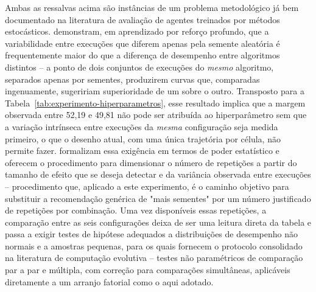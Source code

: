 \documentclass[12pt,a4paper]{article}
\begin{document}
Ambas as ressalvas acima são instâncias de um problema metodológico já bem documentado na
literatura de avaliação de agentes treinados por métodos estocásticos.
 demonstram, em aprendizado por reforço profundo, que a
variabilidade entre execuções que diferem apenas pela semente aleatória é frequentemente maior do
que a diferença de desempenho entre algoritmos distintos -- a ponto de dois conjuntos de execuções
do \textit{mesmo} algoritmo, separados apenas por sementes, produzirem curvas que, comparadas
ingenuamente, sugeririam superioridade de um sobre o outro. Transposto para a
Tabela~\ref{tab:experimento-hiperparametros}, esse resultado implica que a margem observada entre
52,19 e 49,81 não pode ser atribuída ao hiperparâmetro sem que a variação intrínseca entre
execuções da \textit{mesma} configuração seja medida primeiro, o que o desenho atual, com uma única
trajetória por célula, não permite fazer.  formalizam essa
exigência em termos de poder estatístico e oferecem o procedimento para dimensionar o número de
repetições a partir do tamanho de efeito que se deseja detectar e da variância observada entre
execuções -- procedimento que, aplicado a este experimento, é o caminho objetivo para substituir a
recomendação genérica de "mais sementes" por um número justificado de repetições por combinação.
Uma vez disponíveis essas repetições, a comparação entre as seis configurações deixa de ser uma
leitura direta da tabela e passa a exigir testes de hipótese adequados a distribuições de
desempenho não normais e a amostras pequenas, para os quais
 fornecem o protocolo consolidado na literatura de computação
evolutiva -- testes não paramétricos de comparação par a par e múltipla, com correção para
comparações simultâneas, aplicáveis diretamente a um arranjo fatorial como o aqui adotado.
\end{document}
